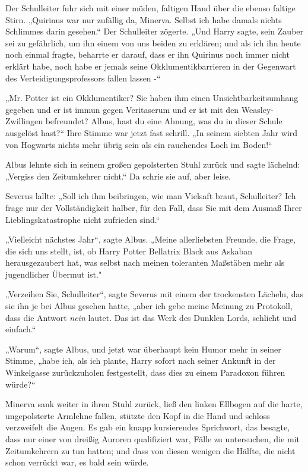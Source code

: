 {Der Schulleiter fuhr sich mit einer müden, faltigen Hand über die ebenso faltige Stirn. „Quirinus war nur zufällig da, Minerva. Selbst ich habe damals nichts Schlimmes darin gesehen.“ Der Schulleiter zögerte. „Und Harry sagte, sein Zauber sei zu gefährlich, um ihn einem von uns beiden zu erklären; und als ich ihn heute noch einmal fragte, beharrte er darauf, dass er ihn Quirinus noch immer nicht erklärt habe, noch habe er jemals seine Okklumentikbarrieren in der Gegenwart des Verteidigungsprofessors fallen lassen -“

„Mr. Potter ist ein Okklumentiker? Sie haben ihm einen Unsichtbarkeitsumhang gegeben und er ist immun gegen Veritaserum und er ist mit den Weasley-Zwillingen befreundet? Albus, hast du eine Ahnung, was du in dieser Schule ausgelöst hast?“ Ihre Stimme war jetzt fast schrill. „In seinem siebten Jahr wird von Hogwarts nichts mehr übrig sein als ein rauchendes Loch im Boden!“

Albus lehnte sich in seinem großen gepolsterten Stuhl zurück und sagte lächelnd: „Vergiss den Zeitumkehrer nicht.“ Da schrie sie auf, aber leise.

Severus lallte: „Soll ich ihm beibringen, wie man Vielsaft braut, Schulleiter? Ich frage nur der Vollständigkeit halber, für den Fall, dass Sie mit dem Ausmaß Ihrer Lieblingskatastrophe nicht zufrieden sind.“

„Vielleicht nächstes Jahr“, sagte Albus. „Meine allerliebsten Freunde, die Frage, die sich uns stellt, ist, ob Harry Potter Bellatrix Black aus Askaban herausgezaubert hat, was selbst nach meinen toleranten Maßstäben mehr als jugendlicher Übermut ist."

„Verzeihen Sie, Schulleiter“, sagte Severus mit einem der trockensten Lächeln, das sie ihn je bei Albus gesehen hatte, „aber ich gebe meine Meinung zu Protokoll, dass die Antwort \emph{nein} lautet. Das ist das Werk des Dunklen Lords, schlicht und einfach.“

„Warum“, sagte Albus, und jetzt war überhaupt kein Humor mehr in seiner Stimme, „habe ich, als ich plante, Harry sofort nach seiner Ankunft in der Winkelgasse zurückzuholen festgestellt, dass dies zu einem Paradoxon führen würde?“

Minerva sank weiter in ihren Stuhl zurück, ließ den linken Ellbogen auf die harte, ungepolsterte Armlehne fallen, stützte den Kopf in die Hand und schloss verzweifelt die Augen. Es gab ein knapp kursierendes Sprichwort, das besagte, dass nur einer von dreißig Auroren qualifiziert war, Fälle zu untersuchen, die mit Zeitumkehrern zu tun hatten; und dass von diesen wenigen die Hälfte, die nicht schon verrückt war, es bald sein würde.

}
